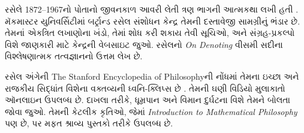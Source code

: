 \documentclass[../../../include/open-logic-section]{subfiles}
\begin{document}
\begin{reading}
રસેલે 1872--1967નો
પોતાનો જીવનકાળ
આવરી લેતી ત્રણ
ભાગની આત્મકથા
લખી હતી
\citep{Russell1967,Russell1968,Russell1969}.
મૅકમાસ્ટર યુનિવર્સિટીમાં
બર્ટ્રાન્ડ રસેલ સંશોધન
કેન્દ્ર તેમની દસ્તાવેજી
સામગ્રીનું ભંડાર છે.
તેમનાં એકત્રિત લખાણોના
ખંડો, તેમાં શોધ કરી
શકાય તેવી સૂચિઓ,
અને સંગ્રહ-પ્રકલ્પો
વિશે જાણકારી માટે
કેન્દ્રની વેબસાઇટ
\citet{Duncan2015} જુઓ.
રસેલનો
\emph{On
  Denoting}
\citep{Russell1905}
વીસમી સદીના
વિશ્લેષણાત્મક
તત્વજ્ઞાનનો ઉત્તમ
લેખ છે.

રસેલ અંગેની
The Stanford Encyclopedia of Philosophyની
નોંધમાં તેમના
ઇચ્છા અને રાજકીય
સિદ્ધાંત વિશેના
વક્તવ્યની ધ્વનિ-ક્લિપ્સ
છે \citep{Irvine2015}.
તેમની ઘણી વિડિયો
મુલાકાતો ઑનલાઇન
ઉપલબ્ધ છે. દાખલા
તરીકે, ધૂમ્રપાન
અને વિમાન દુર્ઘટના
વિશે તેમને બોલતા
જોવા \citet{RussellND}
જુઓ. તેમની કેટલીક
કૃતિઓ, જેમાં
\emph{Introduction to Mathematical Philosophy}
પણ છે, \citet{LibriVoxND}
પર મફત શ્રાવ્ય
પુસ્તકો તરીકે
ઉપલબ્ધ છે.
\end{reading}
\end{document}
